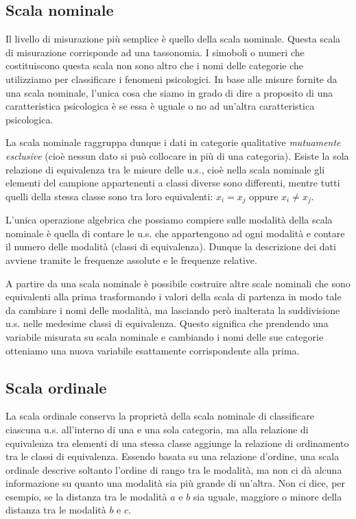 \documentclass[
  11pt,
]{krantz}
\theoremstyle{definition}
\theoremstyle{definition}
\theoremstyle{definition}
\theoremstyle{definition}
\theoremstyle{remark}
\begin{document}
\hypertarget{scala-nominale}{%
\subsection{Scala nominale}\label{scala-nominale}}

Il livello di misurazione più semplice è quello della scala nominale. Questa scala di misurazione corrisponde ad una tassonomia. I simoboli o numeri che costituiscono questa scala non sono altro che i nomi delle categorie che utilizziamo per classificare i fenomeni psicologici. In base alle misure fornite da una scala nominale, l'unica cosa che siamo in grado di dire a proposito di una caratteristica psicologica è se essa è uguale o no ad un'altra caratteristica psicologica.

La scala nominale raggruppa dunque i dati in categorie qualitative \emph{mutuamente esclusive} (cioè nessun dato si può collocare in più di una categoria). Esiste la sola relazione di equivalenza tra le misure delle u.s., cioè nella scala nominale gli elementi del campione appartenenti a classi diverse sono differenti, mentre tutti quelli della stessa classe sono tra loro equivalenti: \(x_i = x_j\) oppure \(x_i \neq x_j\).

L'unica operazione algebrica che possiamo compiere sulle modalità della scala nominale è quella di contare le u.s. che appartengono ad ogni modalità e contare il numero delle modalità (classi di equivalenza). Dunque la descrizione dei dati avviene tramite le frequenze assolute e le frequenze relative.

A partire da una scala nominale è possibile costruire altre scale nominali che sono equivalenti alla prima trasformando i valori della scala di partenza in modo tale da cambiare i nomi delle modalità, ma lasciando però inalterata la suddivisione u.s. nelle medesime classi di equivalenza. Questo significa che prendendo una variabile misurata su scala nominale e cambiando i nomi delle sue categorie otteniamo una nuova variabile esattamente corrispondente alla prima.

\hypertarget{scala-ordinale}{%
\subsection{Scala ordinale}\label{scala-ordinale}}

La scala ordinale conserva la proprietà della scala nominale di classificare ciascuna u.s. all'interno di una e una sola categoria, ma alla relazione di equivalenza tra elementi di una stessa classe aggiunge la relazione di ordinamento tra le classi di equivalenza. Essendo basata su una relazione d'ordine, una scala ordinale descrive soltanto l'ordine di rango tra le modalità, ma non ci dà alcuna informazione su quanto una modalità sia più grande di un'altra. Non ci dice, per esempio, se la distanza tra le modalità \(a\) e \(b\) sia uguale, maggiore o minore della distanza tra le modalità \(b\) e \(c\).
\end{document}
